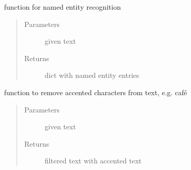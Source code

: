 \documentclass[letterpaper,10pt,english]{sphinxmanual}
\begin{document}
\begin{fulllineitems}
\label{\detokenize{index:data_preprocessing.data_preprocessing.named_entity_recognition}}
\sphinxAtStartPar
function for named entity recognition
\begin{quote}\begin{description}
\item[{Parameters}] \leavevmode
\sphinxAtStartPar
{} \textendash{} given text

\item[{Returns}] \leavevmode
\sphinxAtStartPar
dict with named entity entries

\end{description}\end{quote}

\end{fulllineitems}


\begin{fulllineitems}
\label{\detokenize{index:data_preprocessing.data_preprocessing.remove_accented_chars}}
\sphinxAtStartPar
function to remove accented characters from text, e.g. café
\begin{quote}\begin{description}
\item[{Parameters}] \leavevmode
\sphinxAtStartPar
{} \textendash{} given text

\item[{Returns}] \leavevmode
\sphinxAtStartPar
filtered text with accented text

\end{description}\end{quote}

\end{fulllineitems}

\end{document}
